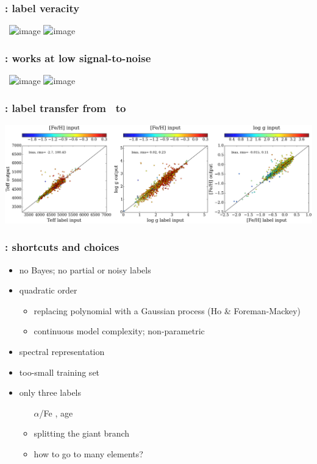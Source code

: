 \documentclass[pdftex]{beamer}
\begin{document}
\begin{frame}
  \frametitle{\tc: label veracity}
  ~\hfill\includegraphics<1>[height=\figureheight]{../documents/plots/iso2_2.png}
         \includegraphics<2>[height=\figureheight]{../documents/plots/iso2a_2.png}
\end{frame}

\begin{frame}
  \frametitle{\tc: works at low signal-to-noise}
  ~\hfill\includegraphics<1>[height=\figureheight]{../documents/plots/SNR100to200.png}
         \includegraphics<2>[height=\figureheight]{../documents/plots/SNR20to30.png}
\end{frame}

\begin{frame}
  \frametitle{\tc: label transfer from \apogee\ to }
  \includegraphics[width=\figurewidth]{LAMOST.png}
\end{frame}

\results

\begin{frame}
  \frametitle{\tc: shortcuts and choices}
  \begin{itemize}
  \item no Bayes; no partial or noisy labels
  \item quadratic order
    \begin{itemize}
    \item replacing polynomial with a Gaussian process (Ho \& Foreman-Mackey)
    \item continuous model complexity; non-parametric
    \end{itemize}
  \item spectral representation
  \item too-small training set
  \item only three labels
    \begin{itemize}
    \item [$\alpha$/Fe], age
    \item splitting the giant branch
    \item how to go to many elements?
    \end{itemize}
  \end{itemize}
\end{frame}
\end{document}
